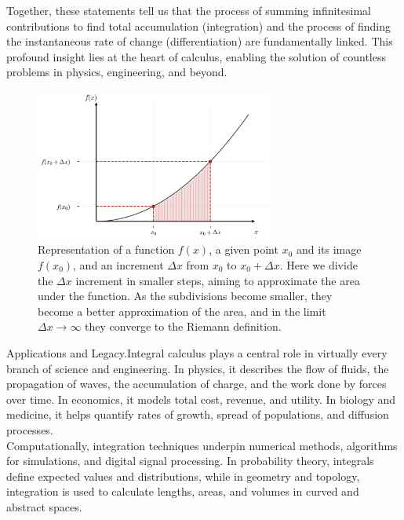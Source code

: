 \documentclass{book}
\begin{document}
Together, these statements tell us that the process of summing infinitesimal contributions to find total accumulation (integration) and the process of finding the instantaneous rate of change (differentiation) are fundamentally linked. This profound insight lies at the heart of calculus, enabling the solution of countless problems in physics, engineering, and beyond.

\begin{figure}[ht]
    \centering
    \includegraphics[width=0.7\textwidth]{figures/appendix/integrals_3_riemann.png}
    \caption{Representation of a function $f(x)$, a given point $x_0$ and its image $f(x_0)$, and an increment $\Delta x$ from $x_0$ to $x_0 + \Delta x$. Here we divide the $\Delta x$ increment in smaller steps, aiming to approximate the area under the function. As the subdivisions become smaller, they become a better approximation of the area, and in the limit $\Delta x \rightarrow \infty$ they converge to the Riemann definition.}
    \label{fig:integrals_3_riemann}
\end{figure}

Applications and Legacy.Integral calculus plays a central role in virtually every branch of science and engineering. In physics, it describes the flow of fluids, the propagation of waves, the accumulation of charge, and the work done by forces over time. In economics, it models total cost, revenue, and utility. In biology and medicine, it helps quantify rates of growth, spread of populations, and diffusion processes.\\

Computationally, integration techniques underpin numerical methods, algorithms for simulations, and digital signal processing. In probability theory, integrals define expected values and distributions, while in geometry and topology, integration is used to calculate lengths, areas, and volumes in curved and abstract spaces.\\
\end{document}
